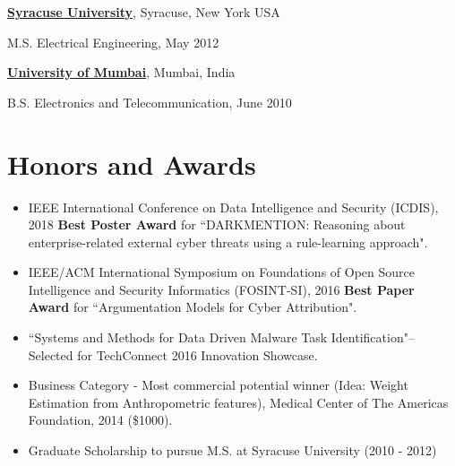 \documentclass[margin,line]{CV}
\newenvironment{list1}{
  \begin{list}{\ding{113}}{%
      \setlength{\itemsep}{0in}
      \setlength{\parsep}{0in} \setlength{\parskip}{0in}
      \setlength{\topsep}{0in} \setlength{\partopsep}{0in} 
      \setlength{\leftmargin}{0.17in}}}{\end{list}}
\begin{document}
\begin{resume}
\href{http://www.syr.edu/}{\bf Syracuse University}, Syracuse, New York USA\\
\vspace*{-.1in}
\begin{list1}
\item[] M.S. Electrical Engineering,  May 2012
\end{list1}

\href{http://archive.mu.ac.in/}{\bf University of Mumbai}, Mumbai, India\\
\vspace*{-.1in}
\begin{list1}
\item[] B.S. Electronics and Telecommunication,  June 2010
\end{list1}


\section{\sc Honors and Awards} 
\begin{itemize}[leftmargin =*]
	
	
\item IEEE International Conference on Data Intelligence and Security (ICDIS), 2018 \textbf{Best Poster Award} for ``DARKMENTION: Reasoning about enterprise-related external cyber threats using a rule-learning approach".

\item IEEE/ACM International Symposium on Foundations of Open Source Intelligence and Security Informatics (FOSINT-SI), 2016 \textbf{Best Paper Award} for ``Argumentation Models for Cyber Attribution". 

\item ``Systems and Methods for Data Driven Malware Task Identification"-- Selected for TechConnect
2016 Innovation Showcase.

\item Business Category - Most commercial potential winner (Idea: Weight Estimation from Anthropometric features), Medical Center of The Americas Foundation, 2014 (\$1000).

\item Graduate Scholarship to pursue M.S. at Syracuse University (2010 - 2012)
\end{itemize}

\end{resume}
\end{document}
